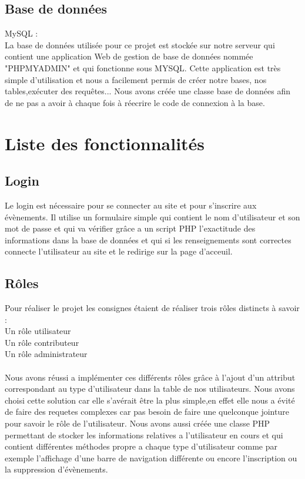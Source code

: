 \documentclass[french]{article}
\begin{document}
            \subsection{Base de données}
            MySQL :\\ La base de données utilisée pour ce projet est stockée sur notre serveur qui contient une application Web de gestion de base de données nommée "PHPMYADMIN" et qui fonctionne sous MYSQL.
            Cette application est très simple d'utilisation et nous a facilement permis de créer notre bases, nos tables,exécuter des requêtes...
            Nous avons créée une classe base de données afin de ne pas a avoir à chaque fois à réecrire le code de connexion à la base.
            
        \section{Liste des fonctionnalités}
            \subsection{Login}
            Le login est nécessaire pour se connecter au site et pour s'inscrire aux évènements.
            Il utilise un formulaire simple qui contient le nom d'utilisateur et son mot de passe et qui va vérifier grâce a un script PHP l'exactitude des informations dans la base de données et qui si les renseignements sont correctes connecte l'utilisateur au site et le redirige sur la page d'acceuil.
            \subsection{Rôles}
            Pour réaliser le projet les consignes étaient de réaliser trois rôles distincts à savoir :\\
            Un rôle utilisateur\\
            Un rôle contributeur\\
            Un rôle administrateur\\\\
            Nous avons réussi a implémenter ces différents rôles grâce à l'ajout d'un attribut correspondant au type d'utilisateur dans la table de nos utilisateurs.
            Nous avons choisi cette solution car elle s'avérait être la plus simple,en effet elle nous a évité de faire des requetes complexes car pas besoin de faire une quelconque jointure pour savoir le rôle de l'utilisateur.
            Nous avons aussi créée une classe PHP permettant de stocker les informations relatives a l'utilisateur en cours et qui contient différentes méthodes propre a chaque type d'utilisateur comme par exemple l'affichage d'une barre de navigation différente ou encore l'inscription ou la suppression d'évènements. 
\end{document}

